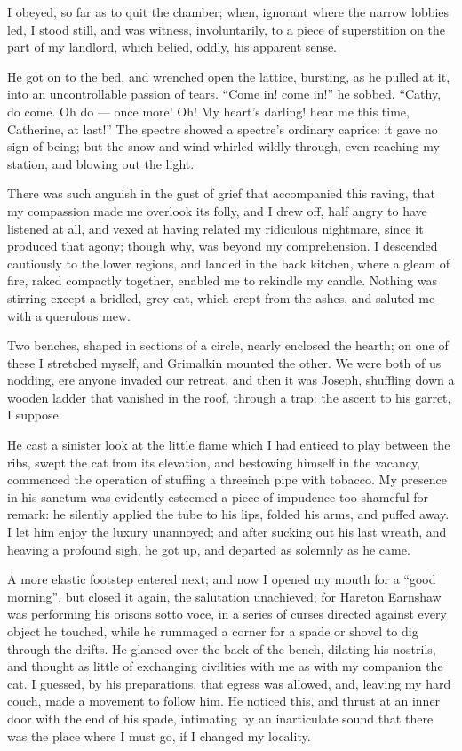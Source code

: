 \par I obeyed, so far as to quit the chamber; when, ignorant where the narrow lobbies led, I stood still, and was witness, involuntarily, to a piece of superstition on the part of my landlord, which belied, oddly, his apparent sense.
\par He got on to the bed, and wrenched open the lattice, bursting, as he pulled at it, into an uncontrollable passion of tears. “Come in! come in!” he sobbed. “Cathy, do come. Oh do — once more! Oh! My heart's darling! hear me this time, Catherine, at last!” The spectre showed a spectre's ordinary caprice: it gave no sign of being; but the snow and wind whirled wildly through, even reaching my station, and blowing out the light.
\par There was such anguish in the gust of grief that accompanied this raving, that my compassion made me overlook its folly, and I drew off, half angry to have listened at all, and vexed at having related my ridiculous nightmare, since it produced that agony; though why, was beyond my comprehension. I descended cautiously to the lower regions, and landed in the back kitchen, where a gleam of fire, raked compactly together, enabled me to rekindle my candle. Nothing was stirring except a bridled, grey cat, which crept from the ashes, and saluted me with a querulous mew.
\par Two benches, shaped in sections of a circle, nearly enclosed the hearth; on one of these I stretched myself, and Grimalkin mounted the other. We were both of us nodding, ere anyone invaded our retreat, and then it was Joseph, shuffling down a wooden ladder that vanished in the roof, through a trap: the ascent to his garret, I suppose.
\par He cast a sinister look at the little flame which I had enticed to play between the ribs, swept the cat from its elevation, and bestowing himself in the vacancy, commenced the operation of stuffing a threeinch pipe with tobacco. My presence in his sanctum was evidently esteemed a piece of impudence too shameful for remark: he silently applied the tube to his lips, folded his arms, and puffed away. I let him enjoy the luxury unannoyed; and after sucking out his last wreath, and heaving a profound sigh, he got up, and departed as solemnly as he came.
\par A more elastic footstep entered next; and now I opened my mouth for a “good morning”, but closed it again, the salutation unachieved; for Hareton Earnshaw was performing his orisons sotto voce, in a series of curses directed against every object he touched, while he rummaged a corner for a spade or shovel to dig through the drifts. He glanced over the back of the bench, dilating his nostrils, and thought as little of exchanging civilities with me as with my companion the cat. I guessed, by his preparations, that egress was allowed, and, leaving my hard couch, made a movement to follow him. He noticed this, and thrust at an inner door with the end of his spade, intimating by an inarticulate sound that there was the place where I must go, if I changed my locality.
